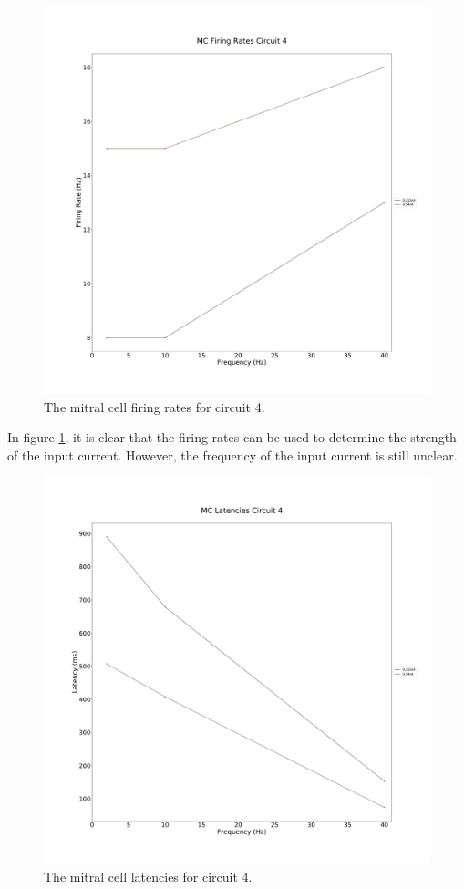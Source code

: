 \documentclass[11pt]{report}
\begin{document}
\begin{figure}[!ht]
\centering
\includegraphics[scale=0.3]{Figures/MC_firing_rate_C4.pdf}
\caption{The mitral cell firing rates for circuit 4.}
\label{fig:MC_FR_C4}
\end{figure} 

In figure \ref{fig:MC_FR_C4}, it is clear that the firing rates can be used to determine the strength of the input current. However, the frequency of the input current is still unclear. 
\newpage

\begin{figure}[!ht]
\centering
\includegraphics[scale=0.3]{Figures/MC_latencies_C4.pdf}
\caption{The mitral cell latencies for circuit 4.}
\label{fig:MC_L_C4}
\end{figure} 
\end{document}
